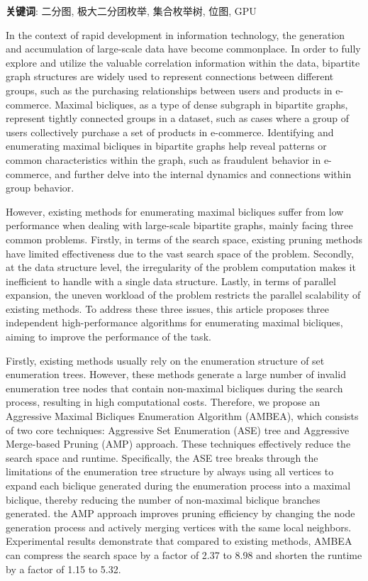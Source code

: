 \vspace{\baselineskip}

\noindent \textbf{关键词}: 二分图, 极大二分团枚举, 集合枚举树, 位图, GPU

\cleardoublepage
{}

In the context of rapid development in information technology, the generation and accumulation of large-scale data have become commonplace. In order to fully explore and utilize the valuable correlation information within the data, bipartite graph structures are widely used to represent connections between different groups, such as the purchasing relationships between users and products in e-commerce. Maximal bicliques, as a type of dense subgraph in bipartite graphs, represent tightly connected groups in a dataset, such as cases where a group of users collectively purchase a set of products in e-commerce. Identifying and enumerating maximal bicliques in bipartite graphs help reveal patterns or common characteristics within the graph, such as fraudulent behavior in e-commerce, and further delve into the internal dynamics and connections within group behavior.

However, existing methods for enumerating maximal bicliques suffer from low performance when dealing with large-scale bipartite graphs, mainly facing three common problems. Firstly, in terms of the search space, existing pruning methods have limited effectiveness due to the vast search space of the problem. Secondly, at the data structure level, the irregularity of the problem computation makes it inefficient to handle with a single data structure. Lastly, in terms of parallel expansion, the uneven workload of the problem restricts the parallel scalability of existing methods. To address these three issues, this article proposes three independent high-performance algorithms for enumerating maximal bicliques, aiming to improve the performance of the task.

Firstly, existing methods usually rely on the enumeration structure of set enumeration trees. However, these methods generate a large number of invalid enumeration tree nodes that contain non-maximal bicliques during the search process, resulting in high computational costs. Therefore, we propose an Aggressive Maximal Bicliques Enumeration Algorithm (AMBEA), which consists of two core techniques: Aggressive Set Enumeration (ASE) tree and Aggressive Merge-based Pruning (AMP) approach. These techniques effectively reduce the search space and runtime. Specifically, the ASE tree breaks through the limitations of the enumeration tree structure by always using all vertices to expand each biclique generated during the enumeration process into a maximal biclique, thereby reducing the number of non-maximal biclique branches generated. the AMP approach improves pruning efficiency by changing the node generation process and actively merging vertices with the same local neighbors. Experimental results demonstrate that compared to existing methods, AMBEA can compress the search space by a factor of 2.37 to 8.98 and shorten the runtime by a factor of 1.15 to 5.32.

